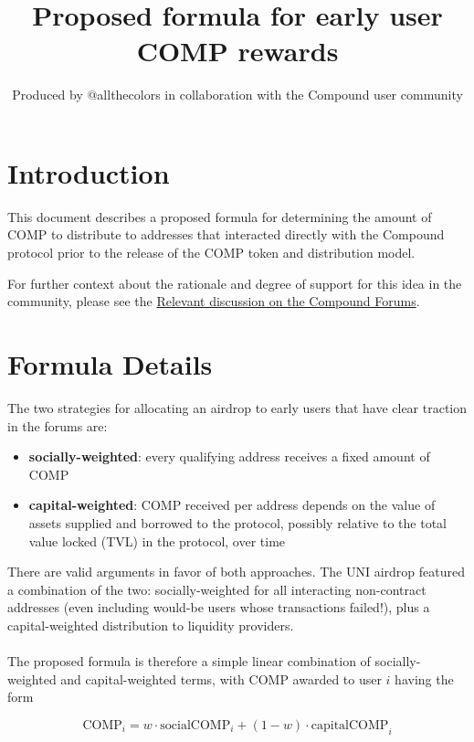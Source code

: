 \documentclass[12pt]{article}
\title{Proposed formula for early user COMP rewards}
\author{Produced by @allthecolors in collaboration with the Compound user community}
\begin{document}
\maketitle

\section{Introduction}

This document describes a proposed formula for determining the amount of COMP
to distribute to addresses that interacted directly with the Compound protocol
prior to the release of the COMP token and distribution model.

For further context about the rationale and degree of support for this idea
in the community, please see the
\href{https://www.comp.xyz/t/should-compound-retroactively-airdrop-tokens-to-early-users/595}{Relevant discussion on the Compound Forums}.


\section{Formula Details}

The two strategies for allocating an airdrop to early users that have clear traction
in the forums are:
\begin{itemize}
  \item{\textbf{socially-weighted}: every qualifying address receives a fixed amount of COMP}
  \item{\textbf{capital-weighted}: COMP received per address depends on the value of
        assets supplied and borrowed to the protocol, possibly relative to the total
        value locked (TVL) in the protocol, over time}
\end{itemize}
There are valid arguments in favor of both approaches. The UNI airdrop featured
a combination of the two: socially-weighted for all interacting non-contract addresses
(even including would-be users whose transactions failed!),
plus a capital-weighted distribution to liquidity providers.
\\\\
The proposed formula is therefore a simple linear combination of
socially-weighted and capital-weighted terms, with COMP awarded to user $i$ having the form

\begin{equation*}
\mathrm{COMP}_i = w\cdot\mathrm{socialCOMP}_i + \left(1-w\right)\cdot\mathrm{capitalCOMP}_i
\end{equation*}
\end{document}
